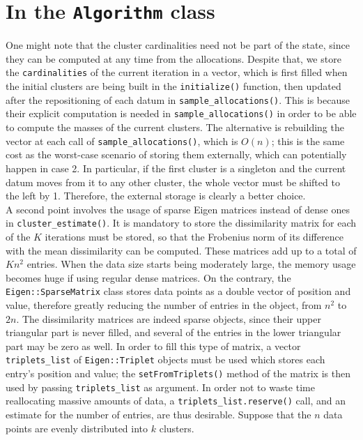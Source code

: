 \section{In the \texttt{Algorithm} class}
One might note that the cluster cardinalities need not be part of the state, since they can be computed at any time from the allocations.
Despite that, we store the \verb|cardinalities| of the current iteration in a vector, which is first filled when the initial clusters are being built in the \verb|initialize()| function, then updated after the repositioning of each datum in \verb|sample_allocations()|.
This is because their explicit computation is needed in \verb|sample_allocations()| in order to be able to compute the masses of the current clusters.
The alternative is rebuilding the vector at each call of \verb|sample_allocations()|, which is $O(n)$; this is the same cost as the worst-case scenario of storing them externally, which can potentially happen in case 2.
In particular, if the first cluster is a singleton and the current datum moves from it to any other cluster, the whole vector must be shifted to the left by 1.
Therefore, the external storage is clearly a better choice. \\[8pt]
A second point involves the usage of sparse Eigen matrices instead of dense ones in \verb|cluster_estimate()|.
It is mandatory to store the dissimilarity matrix for each of the $K$ iterations must be stored, so that the Frobenius norm of its difference with the mean dissimilarity can be computed.
These matrices add up to a total of $K n^2$ entries.
When the data size starts being moderately large, the memory usage becomes huge if using regular dense matrices.
On the contrary, the \verb|Eigen::SparseMatrix| class stores data points as a double vector of position and value, therefore greatly reducing the number of entries in the object, from $n^2$ to $2n$.
The dissimilarity matrices are indeed sparse objects, since their upper triangular part is never filled, and several of the entries in the lower triangular part may be zero as well.
In order to fill this type of matrix, a vector \verb|triplets_list| of \verb|Eigen::Triplet| objects must be used which stores each entry's position and value; the \verb|setFromTriplets()| method of the matrix is then used by passing \verb|triplets_list| as argument.
In order not to waste time reallocating massive amounts of data, a \verb|triplets_list.reserve()| call, and an estimate for the number of entries, are thus desirable.
Suppose that the $n$ data points are evenly distributed into $k$ clusters.
